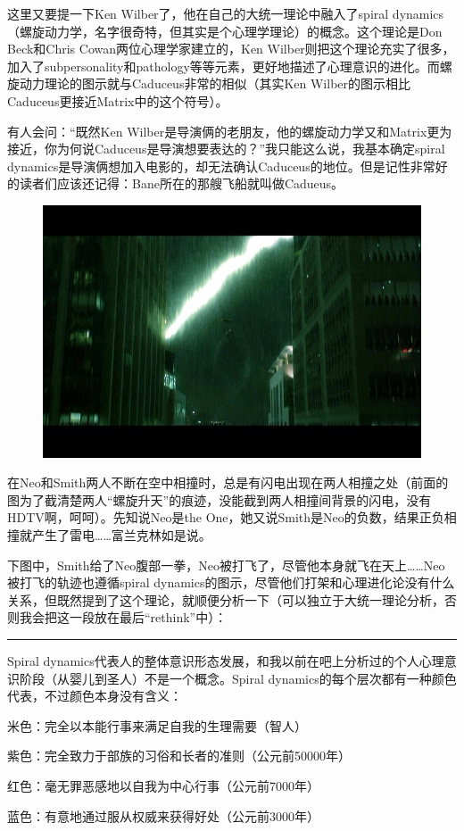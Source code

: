 \documentclass[UTF8]{ctexart}
\newcommand{\myparsep}{\noindent \rule[0.5ex]{\linewidth}{1pt}}
\begin{document}
这里又要提一下Ken Wilber了，他在自己的大统一理论中融入了spiral dynamics（螺旋动力学，名字很奇特，但其实是个心理学理论）的概念。这个理论是Don Beck和Chris Cowan两位心理学家建立的，Ken Wilber则把这个理论充实了很多，加入了subpersonality和pathology等等元素，更好地描述了心理意识的进化。而螺旋动力理论的图示就与Caduceus非常的相似（其实Ken Wilber的图示相比Caduceus更接近Matrix中的这个符号）。

有人会问：“既然Ken Wilber是导演俩的老朋友，他的螺旋动力学又和Matrix更为接近，你为何说Caduceus是导演想要表达的？”我只能这么说，我基本确定spiral dynamics是导演俩想加入电影的，却无法确认Caduceus的地位。但是记性非常好的读者们应该还记得：Bane所在的那艘飞船就叫做Cadueus。

\begin{figure}[htb]
\centering
\includegraphics[width=0.5\linewidth]{fig/f05a0dd75b9283dea044df73.jpg}
\end{figure}

在Neo和Smith两人不断在空中相撞时，总是有闪电出现在两人相撞之处（前面的图为了截清楚两人“螺旋升天”的痕迹，没能截到两人相撞间背景的闪电，没有HDTV啊，呵呵）。先知说Neo是the One，她又说Smith是Neo的负数，结果正负相撞就产生了雷电……富兰克林如是说。

下图中，Smith给了Neo腹部一拳，Neo被打飞了，尽管他本身就飞在天上……Neo被打飞的轨迹也遵循spiral dynamics的图示，尽管他们打架和心理进化论没有什么关系，但既然提到了这个理论，就顺便分析一下（可以独立于大统一理论分析，否则我会把这一段放在最后“rethink”中）：

\myparsep

Spiral dynamics代表人的整体意识形态发展，和我以前在吧上分析过的个人心理意识阶段（从婴儿到圣人）不是一个概念。Spiral dynamics的每个层次都有一种颜色代表，不过颜色本身没有含义：

米色：完全以本能行事来满足自我的生理需要（智人）

紫色：完全致力于部族的习俗和长者的准则（公元前50000年）

红色：毫无罪恶感地以自我为中心行事（公元前7000年）

蓝色：有意地通过服从权威来获得好处（公元前3000年）
\end{document}
